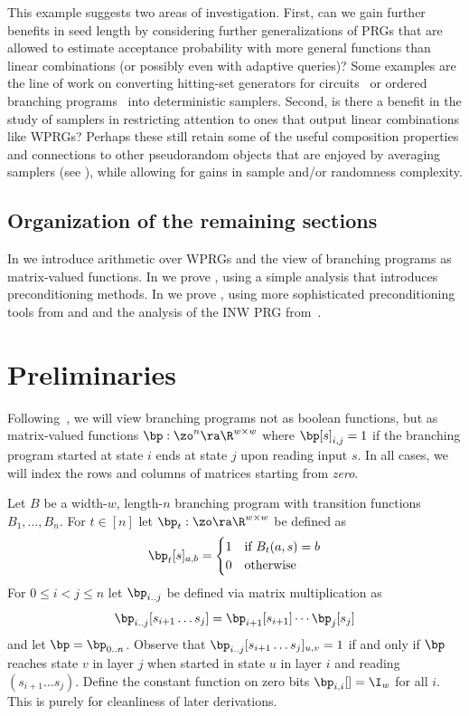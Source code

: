 This example suggests two areas of investigation.  First, can we gain further benefits in seed length by considering further generalizations of PRGs that are allowed to estimate acceptance probability with more general functions than linear combinations (or possibly even with adaptive queries)?  Some examples are the
line of work on converting hitting-set generators for circuits~\cite{AndreevClRo98,AndreevClRoTr99,BuhrmanFo99,GoldreichVaWi11} or ordered branching programs~\cite{ChengHo20} into deterministic samplers.
Second, is there a benefit in the study of samplers in restricting attention to ones that output linear combinations like WPRGs?  Perhaps these still %
retain  %
some of the useful composition properties and connections to other pseudorandom objects that are enjoyed by averaging samplers %
(see  %
\cite{Zuckerman97,vadhan2012pseudorandomness,Agrawal19}), while allowing for gains in sample and/or randomness complexity.

\subsection{Organization of the remaining sections}
In  we introduce arithmetic over WPRGs and the view of branching programs as %
matrix-valued  %
functions. In  we prove , using a simple analysis that introduces preconditioning methods. In  we prove , using more sophisticated preconditioning tools from \cite{AhmadinejadKeMuPeSiVa19} and \cite{CKPPRSV17} and the analysis of the INW PRG from~\cite{HozaPyVa21}.

\section{Preliminaries}\label{sec:prelim}
Following~\cite{ReingoldStVa13}, we will view branching programs not as boolean functions, but as matrix-valued functions $\bp:\zo^n\ra\R^{w\times w}$ where $\bp[s]_{i,j}=1$ if the branching program started at state $i$ ends at state $j$ upon reading input $s$. In all cases, we will index the rows and columns of matrices starting from \emph{zero}.

\begin{definition}
Let $B$ be a width-$w$, length-$n$ branching program with transition functions $B_1,\ldots,B_n$. For $t\in [n]$ let $\bp_t:\zo\ra \R^{w\times w}$ be defined as
\[\bp_t[s]_{a,b} = \begin{cases}   
1 & \text{if } B_t(a,s)=b\\
0 & \text{otherwise}
\end{cases}\]
For $0\leq i<j\leq n$ let $\bp_{i..j}$ be defined via matrix multiplication as 
\[\bp_{i..j}[s_{i+1}\dots s_{j}]=\bp_{i+1}[s_{i+1}]\cdots\bp_j[s_j]\]
and let $\bp=\bp_{0..n}$. Observe that $\bp_{i..j}[s_{i+1}\dots s_j]_{u,v}=1$ if and only if $\bp$ reaches state $v$ in layer $j$ when started in state $u$ in layer $i$ and reading $(s_{i+1}\dots s_j)$. Define the constant function on zero bits $\bp_{i,i}[]=\I_w$ for all $i$. This is purely for cleanliness of later derivations.
\end{definition}

